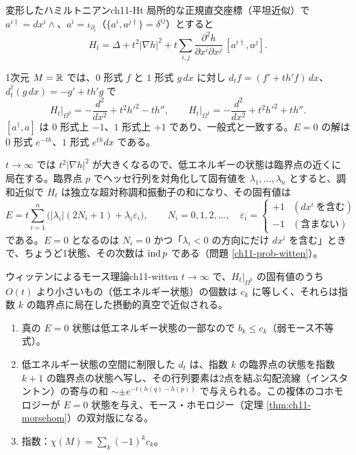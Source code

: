 \begin{myprop}{変形したハミルトニアン}{ch11-Ht}
局所的な正規直交座標（平坦近似）で $a^{i\dagger}=dx^i\wedge$、$a^i=\iota_{\partial_i}$（$\{a^i,a^{j\dagger}\}=\delta^{ij}$）とすると
\[
H_t=\Delta+t^2\lvert\nabla h\rvert^2+t\sum_{i,j}\frac{\partial^2h}{\partial x^i\partial x^j}\,[a^{i\dagger},a^j].
\]
\end{myprop}
\begin{note}
1次元 $M=\mathbb{R}$ では、$0$ 形式 $f$ と $1$ 形式 $g\,dx$ に対し $d_tf=(f'+th'f)\,dx$、$d_t^\dagger(g\,dx)=-g'+th'g$ で
\[
H_t\big|_{\Omega^0}=-\frac{d^2}{dx^2}+t^2h'^2-th'',\qquad H_t\big|_{\Omega^1}=-\frac{d^2}{dx^2}+t^2h'^2+th''.
\]
$[a^\dagger,a]$ は $0$ 形式上 $-1$、$1$ 形式上 $+1$ であり、一般式と一致する。$E=0$ の解は $0$ 形式 $e^{-th}$、$1$ 形式 $e^{th}dx$ である。
\end{note}

$t\to\infty$ では $t^2\lvert\nabla h\rvert^2$ が大きくなるので、低エネルギーの状態は臨界点の近くに局在する。臨界点 $p$ でヘッセ行列を対角化して固有値を $\lambda_1,\dots,\lambda_n$ とすると、調和近似で $H_t$ は独立な超対称調和振動子の和になり、その固有値は
\[
E=t\sum_{i=1}^n\bigl(\lvert\lambda_i\rvert(2N_i+1)+\lambda_i\varepsilon_i\bigr),\qquad N_i=0,1,2,\dots,\quad \varepsilon_i=\begin{cases}+1&(dx^i\ \text{を含む})\\-1&(\text{含まない})\end{cases}
\]
である。$E=0$ となるのは $N_i=0$ かつ「$\lambda_i<0$ の方向にだけ $dx^i$ を含む」ときで、ちょうど1状態、その次数は $\operatorname{ind} p$ である（問題 \ref{ch11-prob-witten}）。

\begin{mythm}{ウィッテンによるモース理論}{ch11-witten}
$t\to\infty$ で、$H_t|_{\Omega^k}$ の固有値のうち $O(t)$ より小さいもの（低エネルギー状態）の個数は $c_k$ に等しく、それらは指数 $k$ の臨界点に局在した摂動的真空で近似される。
\begin{enumerate}
\item 真の $E=0$ 状態は低エネルギー状態の一部なので $b_k\le c_k$（弱モース不等式）。
\item 低エネルギー状態の空間に制限した $d_t$ は、指数 $k$ の臨界点の状態を指数 $k+1$ の臨界点の状態へ写し、その行列要素は2点を結ぶ勾配流線（インスタントン）の寄与の和 $\sim\pm e^{-t(h(q)-h(p))}$ で与えられる。この複体のコホモロジーが $E=0$ 状態を与え、モース・ホモロジー（定理 \ref{thm:ch11-morsehom}）の双対版になる。
\item 指数：$\displaystyle\chi(M)=\sum_k(-1)^kc_k$。
\end{enumerate}
\end{mythm}

